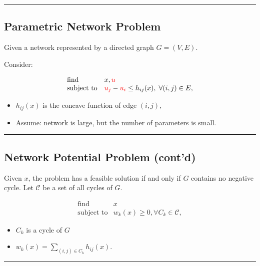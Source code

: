 \documentclass[
]{article}
\begin{document}
\begin{center}\rule{0.5\linewidth}{0.5pt}\end{center}

\subsection{Parametric Network
Problem}\label{parametric-network-problem}

Given a network represented by a directed graph \(G = (V, E)\).

Consider:

\[\begin{array}{ll}
    \text{find} & x, {\color{red}u} \\
    \text{subject to} & {\color{red}u_j} - {\color{red}u_i} \le h_{ij}(x), \; \forall (i, j) \in E ,
   \end{array}\]

\begin{itemize}
\item
  \(h_{ij}(x)\) is the concave function of edge \((i,j)\),
\item
  Assume: network is large, but the number of parameters is small.
\end{itemize}

\begin{center}\rule{0.5\linewidth}{0.5pt}\end{center}

\subsection{Network Potential Problem
(cont'd)}\label{network-potential-problem-contd}

Given \(x\), the problem has a feasible solution if and only if \(G\)
contains no negative cycle. Let \(\mathcal{C}\) be a set of all cycles
of \(G\).

\[\begin{array}{ll}
    \text{find} & x \\
    \text{subject to} & w_k(x) \ge 0, \forall C_k \in \mathcal{C} ,
\end{array}\]

\begin{itemize}
\item
  \(C_k\) is a cycle of \(G\)
\item
  \(w_k(x) = \sum_{ (i,j)\in C_k} h_{ij}(x)\).
\end{itemize}

\begin{center}\rule{0.5\linewidth}{0.5pt}\end{center}
\end{document}
